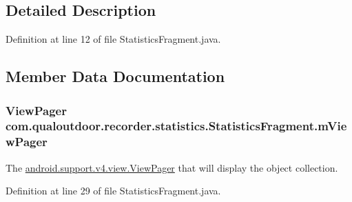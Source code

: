 \subsection{Detailed Description}


Definition at line 12 of file Statistics\-Fragment.\-java.



\subsection{Member Data Documentation}
\hypertarget{classcom_1_1qualoutdoor_1_1recorder_1_1statistics_1_1StatisticsFragment_afd41587fab90a4894b03e036dd002525}{
\subsubsection[{m\-View\-Pager}]{\setlength{\rightskip}{0pt plus 5cm}View\-Pager com.\-qualoutdoor.\-recorder.\-statistics.\-Statistics\-Fragment.\-m\-View\-Pager\hspace{0.3cm}{\ttfamily [private]}}}\label{classcom_1_1qualoutdoor_1_1recorder_1_1statistics_1_1StatisticsFragment_afd41587fab90a4894b03e036dd002525}
The \hyperlink{}{android.\-support.\-v4.\-view.\-View\-Pager} that will display the object collection. 

Definition at line 29 of file Statistics\-Fragment.\-java.


